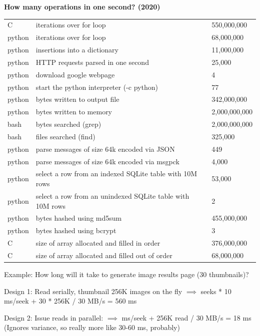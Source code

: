 \documentclass{article}
\begin{document}
    \textbf{How many operations in one second? (2020)}
    \begin{table}[H]
    \begin{tabular}{l|l|l}
        C  & iterations over for loop & 550,000,000 \\
        python & iterations over for loop & 68,000,000 \\
        python & insertions into a dictionary & 11,000,000 \\
        python & HTTP requests parsed in one second & 25,000 \\
        python & download google webpage & 4 \\
        python & start the python interpreter (-c python) & 77 \\
        python & bytes written to output file  &  342,000,000 \\
        python & bytes written to memory & 2,000,000,000 \\
        bash & bytes searched (grep)  &  2,000,000,000 \\
        bash & files searched (find) & 325,000 \\
        python & parse messages of size 64k encoded via JSON &  449 \\
        python & parse messages of size 64k encoded via msgpck &  4,000 \\
         python & select a row from an indexed SQLite table with 10M rows &  53,000 \\
        python & select a row from an unindexed SQLite table with 10M rows &  2 \\
        python & bytes hashed using md5sum &  455,000,000 \\
        python & bytes hashed using bcrypt & 3 \\
        C & size of array allocated and filled in order & 376,000,000 \\
        C & size of array allocated and filled out of order & 68,000,000 \\
    \end{tabular}
    \end{table}
    
    
    Example: How long will it take to generate image results page (30 thumbnails)?
    
    Design 1: Read serially, thumbnail 256K images on the fly $\implies$   seeks * 10 ms/seek + 30 * 256K / 30 MB/s = 560 ms
    
    Design 2: Issue reads in parallel: $\implies$  ms/seek + 256K read / 30 MB/s = 18 ms (Ignores variance, so really more like 30-60 ms, probably)
    
\end{document}
